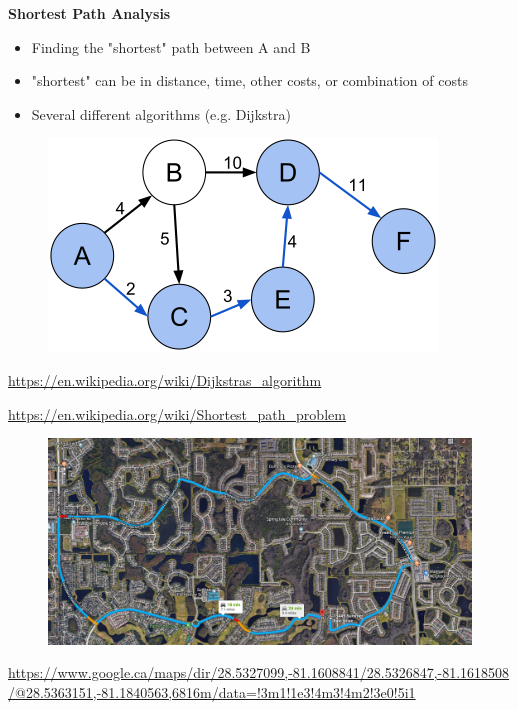 \documentclass[aspectratio=169]{beamer}
\begin{document}
\begin{frame}
	
	\textbf{Shortest Path Analysis}
	
	\begin{itemize}
		\item Finding the "shortest" path between A and B
		\item "shortest" can be in distance, time, other costs, or combination of costs
		\item Several different algorithms (e.g. Dijkstra)
		
	\end{itemize}
	
	\begin{figure}
		\centering
		\includegraphics[width=0.5\linewidth]{images/shortest_path}
	\end{figure}

	\tiny\url{https://en.wikipedia.org/wiki/Dijkstras_algorithm}
	
	\tiny\url{https://en.wikipedia.org/wiki/Shortest_path_problem}	

\end{frame}




\begin{frame}

	\begin{figure}
		\centering
		\includegraphics[width=0.95 \linewidth]{images/orlando}
	\end{figure}
	\tiny \url{https://www.google.ca/maps/dir/28.5327099,-81.1608841/28.5326847,-81.1618508/@28.5363151,-81.1840563,6816m/data=!3m1!1e3!4m3!4m2!3e0!5i1}
\end{frame}
\end{document}
